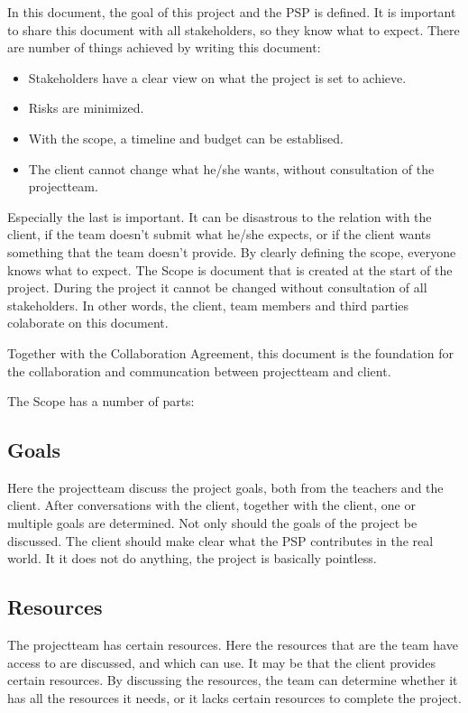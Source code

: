 \documentclass[10pt]{report}
\begin{document}
In this document, the goal of this project and the PSP is defined. It is important to share this document with all stakeholders, so they know what to expect. There are number of things achieved by writing this document:

\begin{itemize}
	\item Stakeholders have a clear view on what the project is set to achieve.
	\item Risks are minimized.
	\item With the scope, a timeline and budget can be establised.
	\item The client cannot change what he/she wants, without consultation of the projectteam.
\end{itemize}

Especially the last is important. It can be disastrous to the relation with the client, if the team doesn't submit what he/she expects, or if the client wants something that the team doesn't provide. By clearly defining the scope, everyone knows what to expect. The Scope is document that is created at the start of the project. During the project it cannot be changed without consultation of all stakeholders. In other words, the client, team members and third parties colaborate on this document.	

Together with the Collaboration Agreement, this document is the foundation for the collaboration and communcation between projectteam and client.

\bigskip

The Scope has a number of parts:

\subsection{Goals}

Here the projectteam discuss the project goals, both from the teachers and the client. After conversations with the client, together with the client, one or multiple goals are determined. Not only should the goals of the project be discussed. The client should make clear what the PSP contributes in the real world. It it does not do anything, the project is basically pointless.

\subsection{Resources}

The projectteam has certain resources. Here the resources that are the team have access to are discussed, and which  can use. It may be that the client provides certain resources. By discussing the resources, the team can determine whether it has all the resources it needs, or it lacks certain resources to complete the project.
\end{document}
